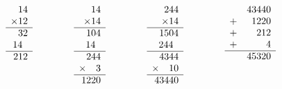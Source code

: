 \[\begin{array}[t]{c@{\hspace*{1.5cm}}c@{\hspace*{1.5cm}} c@{\hspace*{1.5cm}} c@{\hspace*{1.5cm}}  }
\begin{array}[t]{r} 
14 \\
\times 12 \\ 
\hline 
32 \\
14{\;\;}\\
\hline
212 \\
\end{array} 
 & \begin{array}[t]{r} 
    14 \\
    \times 14 \\ 
    \hline 
    104\\
    14{\;\;}\\
    \hline
    244 \\
    \times {\quad} 3 \\
    \hline
    1220\\ 
  \end{array}  &  \begin{array}[t]{r} 
                    244 \\
                    \times 14 \\ 
                    \hline 
                    1504\\
                    244{\;\;}\\
                 \hline
                    4344 \\
            \times {\quad} 10 \\
                \hline
                    43440\\ 
              \end{array}  & \begin{array}[t]{rr} 
                               &  43440 \\
                             + &   1220\\
                             + &    212 \\
                             + &      4 \\
                             \hline 
                             & 45320 \\
                             \end{array}  \\
 \end{array} 
\]

